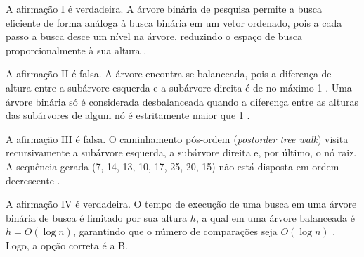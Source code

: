 \documentclass[12pt,a4paper]{article}
\begin{document}
A afirmação I é verdadeira.
A árvore binária de pesquisa permite a busca eficiente de forma análoga à busca binária em um vetor ordenado,
pois a cada passo a busca desce um nível na árvore,
reduzindo o espaço de busca proporcionalmente à sua altura \parencite[seç.~12.2]{clrs2022}.

A afirmação II é falsa.
A árvore encontra-se balanceada,
pois a diferença de altura entre a subárvore esquerda e a subárvore direita é de no máximo 1 \parencite[seç.~13.1]{clrs2022}.
Uma árvore binária só é considerada desbalanceada
quando a diferença entre as alturas das subárvores de algum nó é estritamente maior que 1 \parencite[cap.~13]{clrs2022}.

A afirmação III é falsa.
O caminhamento pós-ordem (\textit{postorder tree walk}) visita recursivamente a subárvore esquerda,
a subárvore direita e, por último, o nó raiz.
A sequência gerada (7, 14, 13, 10, 17, 25, 20, 15) não está disposta em ordem decrescente \parencite[seç.~12.1]{clrs2022}.

A afirmação IV é verdadeira.
O tempo de execução de uma busca em uma árvore binária de busca é limitado por sua altura $h$,
a qual em uma árvore balanceada é $h = O(\log n)$,
garantindo que o número de comparações seja $O(\log n)$ \parencite[seç.~12.2]{clrs2022}.
Logo, a opção correta é a B.
\end{document}
